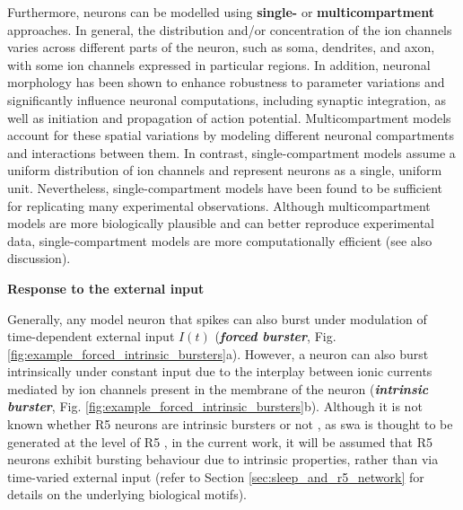 \documentclass[../main.tex]{subfiles}
\begin{document}
Furthermore, neurons can be modelled using \textbf{single-} or \textbf{multicompartment} approaches.
In general, the distribution and/or concentration of the ion channels varies across different parts of the neuron, such as soma, dendrites, and axon, with some ion channels expressed in particular regions. 
In addition, neuronal morphology has been shown to enhance robustness to parameter variations and significantly influence neuronal computations, including synaptic integration, as well as initiation and propagation of action potential.
Multicompartment models account for these spatial variations by modeling different neuronal compartments and interactions between them. In contrast, single-compartment models assume a uniform distribution of ion channels and represent neurons as a single, uniform unit. Nevertheless, single-compartment models have been found to be sufficient for replicating many experimental observations.
Although multicompartment models are more biologically plausible and can better reproduce experimental data, single-compartment models are more computationally efficient (see also discussion).


\vspace*{0.3cm}
\noindent\textbf{Response to the external input}

Generally, any model neuron that spikes can also burst under modulation of
time-dependent external input $I(t)$ \parencite{izhikevichDynamicalSystemsNeuroscience2006}
(\textbf{\textit{forced burster}}, Fig. \ref{fig:example_forced_intrinsic_bursters}a).
However, a neuron can also burst intrinsically under constant input due to the interplay
between ionic currents mediated by ion channels present in the membrane of the neuron
(\textbf{\textit{intrinsic burster}}, Fig. \ref{fig:example_forced_intrinsic_bursters}b).
Although it is not known whether R5 neurons are intrinsic bursters or not
\parencite{raccugliaNetworkSpecificSynchronizationElectrical2019}, as \gls{swa}
is thought to be generated at the level of R5 \parencite{raccugliaNetworkSpecificSynchronizationElectrical2019},
in the current work, it will be assumed that R5 neurons exhibit bursting behaviour
due to intrinsic properties, rather than via time-varied external input (refer to Section \ref{sec:sleep_and_r5_network} for details on the underlying biological motifs).
\end{document}
